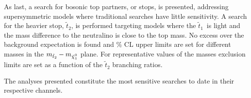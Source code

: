 \documentclass{article}
\def\stoptwo{\ensuremath{\tilde{t}_2}}
\def\stopone{\ensuremath{\tilde{t}_1}}
\def\neutralino{\ensuremath{\mathchoice%
      {\displaystyle\raise.4ex\hbox{$\displaystyle\tilde\chi^0_1$}}%
         {\textstyle\raise.4ex\hbox{$\textstyle\tilde\chi^0_1$}}%
       {\scriptstyle\raise.3ex\hbox{$\scriptstyle\tilde\chi^0_1$}}%
 {\scriptscriptstyle\raise.3ex\hbox{$\scriptscriptstyle\tilde\chi^0_1$}}}}
\begin{document}
As last, a search for bosonic top partners, or stops, is presented, addressing supersymmetric models where traditional searches have little sensitivity. A search for the heavier stop, \stoptwo, is performed targeting models where the \stopone\ is light and the mass difference to the neutralino is close to the top mass. No excess over the background expectation is found and \unit[95]{\%} CL upper limits are set for different masses in the  $m_{\stoptwo}-m_{\neutralino}$ plane. For representative values of the masses exclusion limits are set as a function
of the $\stoptwo$ branching ratios.

The analyses presented constitute the most sensitive searches to date in their respective channels.
\end{document}
